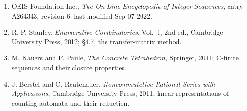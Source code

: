 \documentclass[11pt]{article}
\theoremstyle{definition}
\begin{document}
\begin{enumerate}

\item OEIS Foundation Inc., \emph{The On-Line Encyclopedia of Integer Sequences}, entry \href{https://oeis.org/A264343}{A264343}, revision 6, last modified Sep 07 2022.

\item R. P. Stanley, \emph{Enumerative Combinatorics}, Vol.~1, 2nd ed., Cambridge University Press, 2012; \S4.7, the transfer-matrix method.

\item M. Kauers and P. Paule, \emph{The Concrete Tetrahedron}, Springer, 2011; C-finite sequences and their closure properties.

\item J. Berstel and C. Reutenauer, \emph{Noncommutative Rational Series with Applications}, Cambridge University Press, 2011; linear representations of counting automata and their reduction.

\end{enumerate}
\end{document}
